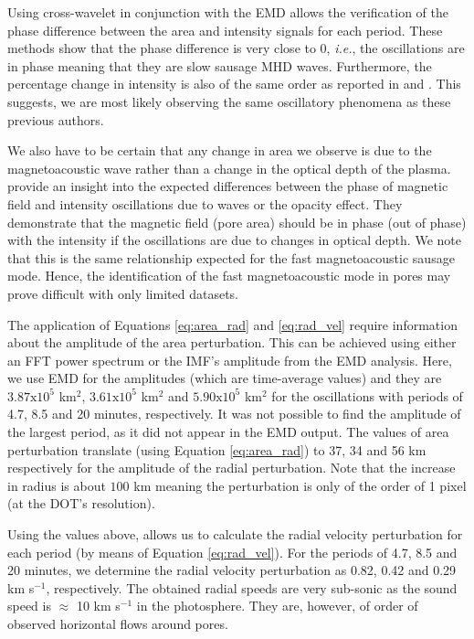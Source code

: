     Using cross-wavelet in conjunction with the EMD allows the verification of the phase difference between the area and intensity signals for each period. 
    These methods show that the phase difference is very close to 0\degree, \textit{i.e.}, the oscillations are in phase meaning that they are slow sausage MHD waves.	
    Furthermore, the percentage change in intensity is also of the same order as reported in \citet{Balthasar2000} and \citet{PMHDW}.
    This suggests, we are most likely observing the same oscillatory phenomena as these previous authors.
    
    We also have to be certain that any change in area we observe is due to the magnetoacoustic wave rather than a change in the optical depth of the plasma.
    \citet{PMHDW} provide an insight into the expected differences between the phase of magnetic field and intensity oscillations due to waves or the opacity effect.
    They demonstrate that the magnetic field (pore area) should be in phase (out of phase) with the intensity if the oscillations are due to changes in optical depth.
    We note that this is the same relationship expected for the fast magnetoacoustic sausage mode.
    Hence, the identification of the fast magnetoacoustic mode in pores may prove difficult with only limited datasets.
    
    The application of Equations \ref{eq:area_rad} and \ref{eq:rad_vel} require information about the amplitude of the area perturbation.
    This can be achieved using either an FFT power spectrum or the IMF's amplitude from the EMD analysis.
    Here, we use EMD for the amplitudes (which are time-average values) and they are $3.87\mathrm{x}10^5$ km$^2$, $3.61\mathrm{x}10^5$ km$^2$ and $5.90\mathrm{x}10^5$ km$^2$ for the oscillations with periods of 4.7, 8.5 and 20 minutes, respectively.
    It was not possible to find the amplitude of the largest period, as it did not appear in the EMD output.
    The values of area perturbation translate (using Equation \ref{eq:area_rad}) to 37, 34 and 56 km respectively for the amplitude of the radial perturbation.
    Note that the increase in radius is about $100$ km meaning the perturbation is only of the order of 1 pixel (at the DOT's resolution).
    
    Using the values above, allows us to calculate the radial velocity perturbation for each period (by means of Equation \ref{eq:rad_vel}).
    For the periods of 4.7, 8.5 and 20 minutes, we determine the radial velocity perturbation as 0.82, 0.42 and 0.29 km s$^{-1}$, respectively.
    The obtained radial speeds are very sub-sonic as the sound speed is $\approx$ 10 km s$^{-1}$ in the photosphere.
    They are, however, of order of observed horizontal flows around pores.
    
